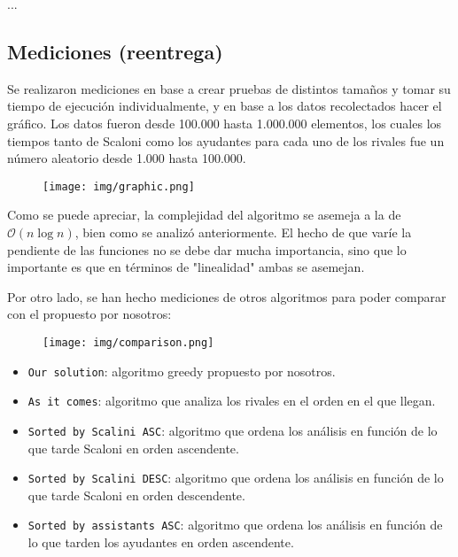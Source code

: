 ...

\subsection{Mediciones (reentrega)}

Se realizaron mediciones en base a crear pruebas de distintos tamaños y tomar su tiempo de ejecución individualmente, y en base a los datos recolectados hacer el gráfico. Los datos fueron desde 100.000 hasta 1.000.000 elementos, los cuales los tiempos tanto de Scaloni como los ayudantes para cada uno de los rivales fue un número aleatorio desde 1.000 hasta 100.000.

\begin{figure}[H]
    \centering
    \texttt{[image: img/graphic.png]}
\end{figure}

Como se puede apreciar, la complejidad del algoritmo se asemeja a la de $\mathcal{O}\left(n \log n\right)$, bien como se analizó anteriormente. El hecho de que varíe la pendiente de las funciones no se debe dar mucha importancia, sino que lo importante es que en términos de "linealidad" ambas se asemejan.

Por otro lado, se han hecho mediciones de otros algoritmos para poder comparar con el propuesto por nosotros:

\begin{figure}[H]
	\centering
	\texttt{[image: img/comparison.png]}
\end{figure}

\begin{itemize}
	\item \texttt{Our solution}: algoritmo greedy propuesto por nosotros.
	\item \texttt{As it comes}: algoritmo que analiza los rivales en el orden en el que llegan.
	\item \texttt{Sorted by Scalini ASC}: algoritmo que ordena los análisis en función de lo que tarde Scaloni en orden ascendente.
	\item \texttt{Sorted by Scalini DESC}: algoritmo que ordena los análisis en función de lo que tarde Scaloni en orden descendente.
	\item \texttt{Sorted by assistants ASC}: algoritmo que ordena los análisis en función de lo que tarden los ayudantes en orden ascendente.
\end{itemize}

